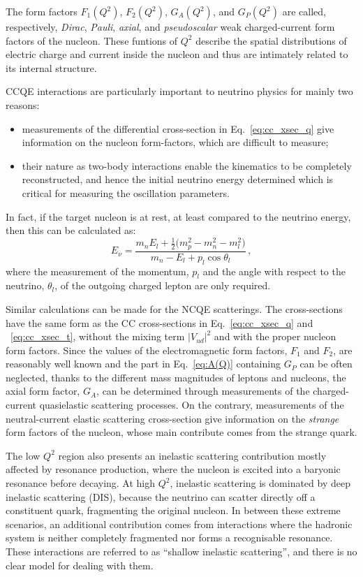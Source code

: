 The form factors $F_1(Q^2)$, $F_2(Q^2)$, $G_A(Q^2)$, and $G_P(Q^2)$ are called, respectively, \emph{Dirac}, %
\emph{Pauli}, \emph{axial}, and \emph{pseudoscalar} weak charged-current form factors of the nucleon.
These funtions of $Q^2$ describe the spatial distributions of electric charge and current inside the nucleon %
and thus are intimately related to its internal structure.

CCQE interactions are particularly important to neutrino physics for mainly two reasons:
\begin{itemize}
	\item measurements of the differential cross-section in Eq.~\ref{eq:cc_xsec_q} give information on the %
		nucleon form-factors, which are difficult to measure; 
	\item their nature as two-body interactions enable the kinematics to be completely reconstructed, %
		and hence the initial neutrino energy determined which is critical for measuring the oscillation parameters.
\end{itemize}

In fact, if the target nucleon is at rest, at least compared to the neutrino energy, %
then this can be calculated as:
\begin{equation}
	E_\nu = \frac{m_n E_l + \frac{1}{2}\big ( m_p^2-m_n^2-m_l^2)}{m_n - E_l+p_l \cos \theta_l}\,,
\end{equation}
where the measurement of the momentum, $p_l$ and the angle with respect to the neutrino, $\theta_l$, of the %
outgoing charged lepton are only required.

Similar calculations can be made for the NCQE scatterings.
The cross-sections have the same form as the CC cross-sections in Eq.~\ref{eq:cc_xsec_q} and ~\ref{eq:cc_xsec_t}, %
without the mixing term $|V_{ud}|^2$ and with the proper nucleon form factors.
Since the values of the electromagnetic form factors, $F_1$ and $F_2$, are reasonably well known and the part %
in Eq.~\ref{eq:A(Q)} containing $G_P$ can be often neglected, thanks to the different mass magnitudes of %
leptons and nucleons, the axial form factor, $G_A$, can be determined through measurements of the charged-current %
quasielastic scattering processes.
On the contrary, measurements of the neutral-current elastic scattering cross-section give information %
on the \emph{strange} form factors of the nucleon, whose main contribute comes from the strange quark.


The low $Q^2$ region also presents an inelastic scattering contribution mostly affected by resonance production, %
where the nucleon is excited into a baryonic resonance before decaying.
At high $Q^2$, inelastic scattering is dominated by deep inelastic scattering (DIS), because the neutrino can scatter %
directly off a constituent quark, fragmenting the original nucleon.
In between these extreme scenarios, an additional contribution comes from interactions where the hadronic %
system is neither completely fragmented nor forms a recognisable resonance.
These interactions are referred to as ``shallow inelastic scattering'', and there is no clear model for dealing %
with them.

